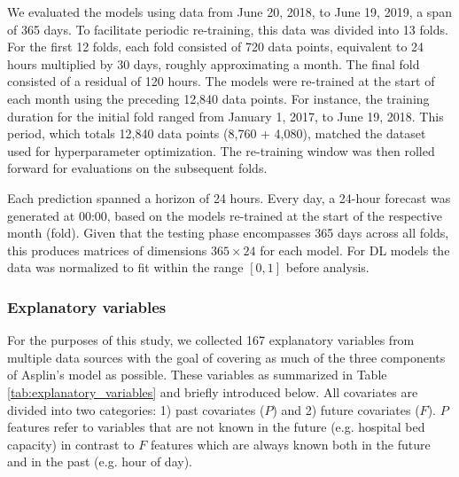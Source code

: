 We evaluated the models using data from June 20, 2018, to June 19, 2019, a span of 365 days. To facilitate periodic re-training, this data was divided into 13 folds. For the first 12 folds, each fold consisted of 720 data points, equivalent to 24 hours multiplied by 30 days, roughly approximating a month. The final fold consisted of a residual of 120 hours. The models were re-trained at the start of each month using the preceding 12,840 data points. For instance, the training duration for the initial fold ranged from January 1, 2017, to June 19, 2018. This period, which totals 12,840 data points (8,760 + 4,080), matched the dataset used for hyperparameter optimization. The re-training window was then rolled forward for evaluations on the subsequent folds.

Each prediction spanned a horizon of 24 hours. Every day, a 24-hour forecast was generated at 00:00, based on the models re-trained at the start of the respective month (fold). Given that the testing phase encompasses 365 days across all folds, this produces matrices of dimensions $365 \times 24$ for each model. For DL models the data was normalized to fit within the range $[0,1]$ before analysis.

\subsubsection{Explanatory variables}

For the purposes of this study, we collected 167 explanatory variables from multiple data sources with the goal of covering as much of the three components of Asplin’s model as possible. These variables as summarized in Table \ref{tab:explanatory_variables} and briefly introduced below. All covariates are divided into two categories: 1) past covariates ($P$) and 2) future covariates ($F$). $P$ features refer to variables that are not known in the future (e.g. hospital bed capacity) in contrast to $F$ features which are always known both in the future and in the past (e.g. hour of day).

